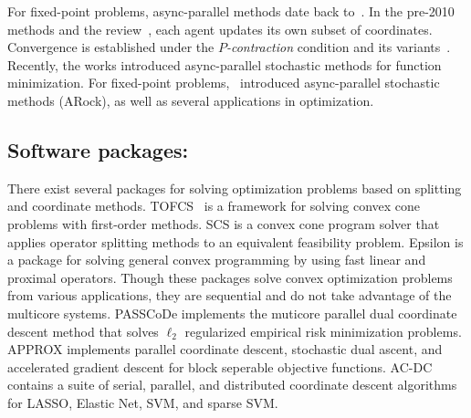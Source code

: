 For fixed-point problems, async-parallel methods date back to~\citep{baudet1978asynchronous}. In  the pre-2010 methods \citep{BMR1997asyn-multisplit,bertsekas1983distributed,Baz200591,el1998flexible} and the review~\citep{frommer2000asynchronous}, each agent updates its own subset of coordinates. Convergence is established under the \emph{$P$-contraction} condition and its variants~\citep{bertsekas1983distributed}. Recently, the works \citep{nedic2001distributed,recht2011hogwild,liu2013asynchronous,liu2014asynchronous,hsieh2015passcode} introduced async-parallel stochastic methods for function minimization.
For fixed-point problems,~\citep{PengXuYanYin2015_arock} introduced async-parallel stochastic methods (ARock), as well as several applications in optimization.



\subsection*{Software packages:}
There exist several packages for solving optimization problems based on splitting and coordinate methods. 
TOFCS~\citep{becker2011templates} is a framework for solving convex cone problems with first-order methods. 
SCS \citep{ocpb:16} is a convex cone program solver that applies operator splitting methods to an equivalent feasibility problem. 
Epsilon \citep{wytock2015convex} is a package for solving general convex programming by using fast linear and proximal operators.
Though these packages solve convex optimization problems from various applications, they are sequential and do not take advantage of
the multicore systems.  
PASSCoDe \citep{hsieh2015passcode} implements the muticore parallel dual coordinate descent method that solves $\ell_2$ regularized 
empirical risk minimization problems.
APPROX\citep{fercoq2015accelerated} implements  parallel coordinate descent, stochastic dual ascent, and accelerated gradient descent for block seperable objective functions.
AC-DC\citep{richtarik2016parallel} contains a suite of serial, parallel, and distributed coordinate descent algorithms for LASSO, Elastic Net, SVM, and sparse SVM.


